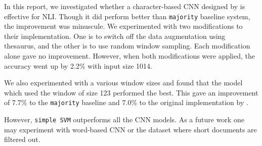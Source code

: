 In this report, we investigated whether a character-based CNN designed by \cite{zhang2015character} is effective for NLI.
Though it did perform better than \texttt{majority} baseline system, the improvement was minuscule. 
We experimented with two modifications to their implementation.
One is to switch off the data augmentation using thesaurus, and the other is to use random window sampling.
Each modification alone gave no improvement. 
However, when both modifications were applied, the accuracy went up by 2.2\% with input size 1014.

We also experimented with a various window sizes and found that the model which used the window of size 123 performed the best. This gave an improvement of 7.7\% to the \texttt{majority} baseline and 7.0\% to the original implementation by \cite{zhang2015character}.

However, \texttt{simple SVM} outperforms all the CNN models.
As a future work one may experiment with word-based CNN or the dataset where short documents are filtered out.